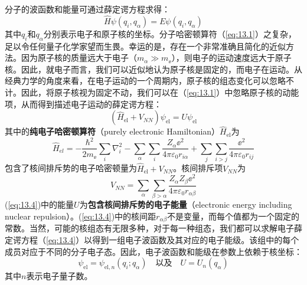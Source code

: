     分子的波函数和能量可通过薛定谔方程求得：
    \begin{equation}
        \hat{H}\psi\left(q_i,q_{\alpha}\right) = E\psi\left(q_i,q_{\alpha}\right)
        \label{eq:13.3}
    \end{equation}
    其中$q_i$和$q_{\alpha}$分别表示电子和原子核的坐标。分子哈密顿算符（\ref{eq:13.1}）之复杂，足以令任何量子化学家望而生畏。幸运的是，存在一个非常准确且简化的近似方法。因为原子核的质量远大于电子（$m_{\alpha} \gg m_{\ee }$），则电子的运动速度远大于原子核。因此，就电子而言，我们可以近似地认为原子核是固定的，而电子在运动。从经典力学的角度来看，在电子运动的一个周期内，原子核的组态变化可以忽略不计。因此，将原子核视为固定不动，我们可以在（\ref{eq:13.1}）中忽略原子核的动能项，从而得到描述电子运动的薛定谔方程：
    \begin{equation}
        \boxed{
            \left(\hat{H}_{\text{el}} + V_{NN}\right)\psi_{\text{el}} = U\psi_{\text{el}}
        }
        \label{eq:13.4}
    \end{equation}
    其中的\textbf{纯电子哈密顿算符}（purely electronic Hamiltonian）$\hat{H}_{\text{el}}$为
    \begin{equation}
        \hat{H}_{el} = - \frac{\hbar^2}{2m_{\ee }} \sum_i \nabla_i^2 - \sum_{\alpha} \sum_{i} \frac{Z_{\alpha} \ee ^2}{4 \pi \varepsilon_0 r_{i\alpha}} + \sum_j \sum_{i>j} \frac{\ee ^2}{4 \pi \varepsilon_0 r_{ij}}
        \label{eq:13.5}
    \end{equation}
    包含了核间排斥势的电子哈密顿量为$\hat{H}_{\text{el}} + V_{NN}$。核间排斥项$V_{NN}$为
    \begin{equation}
        V_{NN} = \sum_{\alpha} \sum_{\beta>\alpha} \frac{Z_{\alpha}Z_{\beta}\ee ^2}{4\pi\varepsilon_0 r_{\alpha\beta}}
        \label{eq:13.6}
    \end{equation}
    (\ref{eq:13.4})中的能量$U$为\textbf{包含核间排斥势的电子能量}（electronic energy including nuclear repulsion）。(\ref{eq:13.4})中的核间距$r_{\alpha\beta}$不是变量，而每个值都为一个固定的常数。当然，可能的核组态有无限多种，对于每一种组态，我们都可以求解电子薛定谔方程（\ref{eq:13.4}）以得到一组电子波函数及其对应的电子能级。该组中的每个成员对应于不同的分子电子态。因此，电子波函数和能级在参数上依赖于核坐标：
    \begin{equation*}
        \psi_{\text{el}} = \psi_{\text{el}, n} \left( q_i ; q_{\alpha} \right) \quad \text{以及} \quad U = U_n \left( q_{\alpha} \right)
    \end{equation*}
    其中$n$表示电子量子数。

